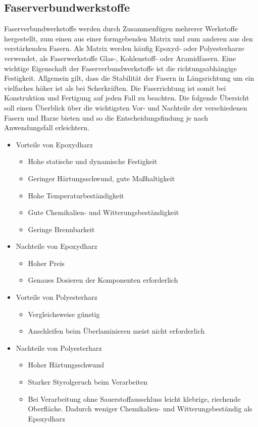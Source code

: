 \documentclass[paper=A4,pagesize,DIV=18, 12pt,listof=totoc,bibliography=totoc,headings=optiontohead,open=any]{article}
\begin{document}
\subsection{Faserverbundwerkstoffe}
Faserverbundwerkstoffe werden durch Zusammenfügen mehrerer Werkstoffe hergestellt, zum einen aus einer formgebenden Matrix und zum anderen aus den verstärkenden Fasern. Als Matrix werden häufig Epoxyd- oder Polyesterharze verwendet, als Faserwerkstoffe Glas-, Kohlenstoff- oder Aramidfasern. Eine wichtige Eigenschaft der Faserverbundwerkstoffe ist die richtungsabhängige Festigkeit. Allgemein gilt, dass die Stabilität der Fasern in Längsrichtung um ein vielfaches höher ist als bei Scherkräften. Die Faserrichtung ist somit bei Konstruktion und Fertigung auf jeden Fall zu beachten.  Die folgende Übersicht soll einen Überblick über die wichtigsten Vor- und Nachteile der verschiedenen Fasern und Harze bieten und so die Entscheidungsfindung je nach Anwendungsfall erleichtern. \cite{r_g_wiki}

\begin{itemize}
	\item Vorteile von Epoxydharz
	\begin{itemize}
		\item Hohe statische und dynamische Festigkeit
		\item Geringer Härtungsschwund, gute Maßhaltigkeit
		\item Hohe Temperaturbeständigkeit
		\item Gute Chemikalien- und Witterungsbeständigkeit
		\item Geringe Brennbarkeit
	\end{itemize}
	\item Nachteile von Epoxydharz
	\begin{itemize}
		\item Hoher Preis
		\item Genaues Dosieren der Komponenten erforderlich
	\end{itemize}
	\item Vorteile von Polyesterharz	
	\begin{itemize}
		\item Vergleichsweise günstig
		\item Anschleifen beim Überlaminieren meist nicht erforderlich
	\end{itemize} 
	\item Nachteile von Polyesterharz
	\begin{itemize}
		\item Hoher Härtungsschwund
		\item Starker Styrolgeruch beim Verarbeiten
		\item Bei Verarbeitung ohne Sauerstoffausschluss leicht klebrige, riechende Oberfläche. Dadurch weniger Chemikalien- und Witterungsbeständig als Epoxydharz
	\end{itemize}	 
\end{itemize}
\end{document}
